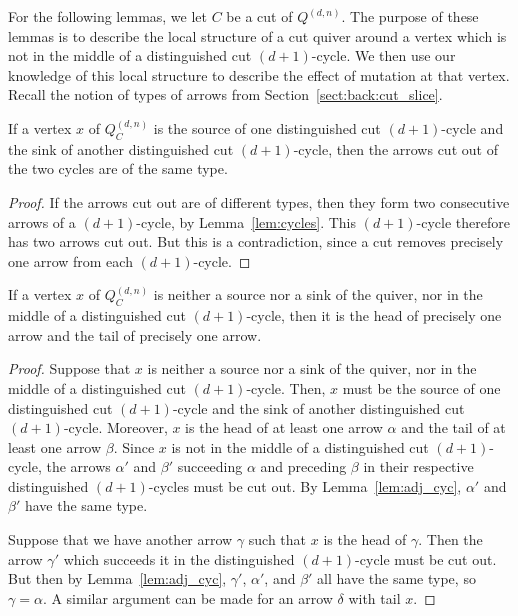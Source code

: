 \documentclass[ALCO,Unicode,published]{cedram}
\newcommand{\qdn}{Q^{(d, n)}}
\begin{document}
For the following lemmas, we let $C$ be a cut of $\qdn$. The purpose of these lemmas is to describe the local structure of a cut quiver around a vertex which is not in the middle of a distinguished cut $(d + 1)$-cycle. We then use our knowledge of this local structure to describe the effect of mutation at that vertex. Recall the notion of types of arrows from Section~\ref{sect:back:cut_slice}.

\begin{lemma}\label{lem:adj_cyc}
If a vertex $x$ of $\qdn_{C}$ is the source of one distinguished cut $(d + 1)$-cycle and the sink of another distinguished cut $(d + 1)$-cycle, then the arrows cut out of the two cycles are of the same type.
\end{lemma}
\begin{proof}
If the arrows cut out are of different types, then they form two consecutive arrows of a $(d + 1)$-cycle, by Lemma~\ref{lem:cycles}. This $(d + 1)$-cycle therefore has two arrows cut out. But this is a contradiction, since a cut removes precisely one arrow from each $(d + 1)$-cycle.
\end{proof}

\begin{lemma}\label{lem:onesrc_onesnk}
If a vertex $x$ of $\qdn_{C}$ is neither a source nor a sink of the quiver, nor in the middle of a distinguished cut $(d + 1)$-cycle, then it is the head of precisely one arrow and the tail of precisely one arrow.
\end{lemma}
\begin{proof}
Suppose that $x$ is neither a source nor a sink of the quiver, nor in the middle of a distinguished cut $(d + 1)$-cycle. Then, $x$ must be the source of one distinguished cut $(d + 1)$-cycle and the sink of another distinguished cut $(d + 1)$-cycle. Moreover, $x$ is the head of at least one arrow $\alpha$ and the tail of at least one arrow $\beta$. Since $x$ is not in the middle of a distinguished cut $(d + 1)$-cycle, the arrows $\alpha'$ and $\beta'$ succeeding $\alpha$ and preceding $\beta$ in their respective distinguished $(d + 1)$-cycles must be cut out. By Lemma~\ref{lem:adj_cyc}, $\alpha'$ and $\beta'$ have the same type.

Suppose that we have another arrow $\gamma$ such that $x$ is the head of $\gamma$. Then the arrow $\gamma'$ which succeeds it in the distinguished $(d + 1)$-cycle must be cut out. But then by Lemma~\ref{lem:adj_cyc}, $\gamma'$, $\alpha'$, and $\beta'$ all have the same type, so $\gamma = \alpha$. A similar argument can be made for an arrow $\delta$ with tail $x$.
\end{proof}
\end{document}
